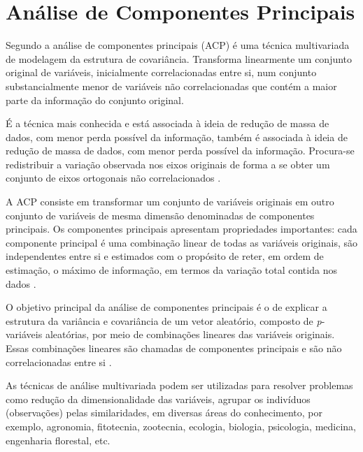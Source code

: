 \section{Análise de Componentes Principais}

Segundo \cite{sandanielo2015} a análise de componentes principais (ACP) é uma técnica multivariada de modelagem da estrutura de covariância. 
Transforma linearmente um conjunto
original de variáveis, inicialmente correlacionadas  entre si, num conjunto substancialmente menor de variáveis não correlacionadas que contém a maior parte da informação do conjunto original. 

É a técnica mais conhecida e
está associada à ideia de redução de massa de dados, com menor perda possível da
informação,
também é associada à ideia de redução de
massa de dados, com menor perda possível
da informação. Procura-se redistribuir a
variação observada nos eixos originais de
forma a se obter um conjunto de eixos
ortogonais não correlacionados  .


A ACP consiste em transformar
um conjunto de variáveis originais em outro
conjunto de variáveis de mesma dimensão
denominadas de componentes principais.
Os componentes principais apresentam
propriedades importantes: cada
componente principal é uma combinação linear de todas as variáveis originais, são
independentes entre si e estimados com o
propósito de reter, em ordem de estimação,
o máximo de informação, em termos da
variação total contida nos dados
   .

O objetivo principal da análise de
componentes principais é o de explicar a
estrutura da variância e covariância de um
vetor aleatório, composto de \textit{p}-variáveis
aleatórias, por meio de combinações
lineares das variáveis originais. Essas
combinações lineares são chamadas de
componentes principais e são não
correlacionadas entre si \cite{sandanielo2015}.

As técnicas de análise multivariada podem ser
utilizadas para resolver problemas como redução da dimensionalidade das variáveis, agrupar os
indivíduos (observações) pelas
similaridades, em diversas áreas do
conhecimento, por exemplo, agronomia,
fitotecnia, zootecnia, ecologia, biologia,
psicologia, medicina, engenharia florestal,
etc.

